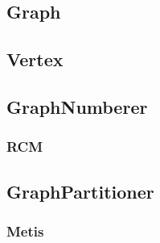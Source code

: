\subsection{Graph}


\pagebreak \subsection{Vertex}


\pagebreak \subsection{{\bf GraphNumberer}}


\pagebreak \subsubsection{RCM}


\pagebreak \subsection{{\bf GraphPartitioner}}


\pagebreak \subsubsection{Metis}


